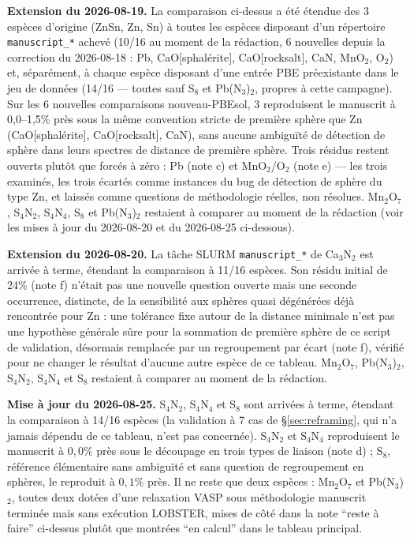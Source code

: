 \textbf{Extension du 2026-08-19.} La comparaison ci-dessus a été
étendue des 3 espèces d'origine (ZnSn, Zn, Sn) à toutes les espèces
disposant d'un répertoire \texttt{manuscript\_*} achevé (10/16 au
moment de la rédaction, 6 nouvelles depuis la correction du
2026-08-18 : Pb, CaO[sphalérite], CaO[rocksalt], CaN, MnO$_2$, O$_2$)
et, séparément, à chaque espèce disposant d'une entrée PBE préexistante
dans le jeu de données (14/16 --- toutes sauf S$_8$ et Pb(N$_3$)$_2$,
propres à cette campagne). Sur les 6 nouvelles comparaisons
nouveau-PBEsol, 3 reproduisent le manuscrit à 0,0--1,5\% près sous la
même convention stricte de première sphère que Zn (CaO[sphalérite],
CaO[rocksalt], CaN), sans aucune ambiguïté de détection de sphère dans
leurs spectres de distance de première sphère. Trois résidus restent
ouverts plutôt que forcés à zéro : Pb (note c) et MnO$_2$/O$_2$
(note e) --- les trois examinés, les trois écartés comme instances du
bug de détection de sphère du type Zn, et laissés comme questions de
méthodologie réelles, non résolues. Mn$_2$O$_7$, S$_4$N$_2$,
S$_4$N$_4$, S$_8$ et Pb(N$_3$)$_2$ restaient à comparer au moment de la
rédaction (voir les mises à jour du 2026-08-20 et du 2026-08-25
ci-dessous).

\textbf{Extension du 2026-08-20.} La tâche SLURM \texttt{manuscript\_*}
de Ca$_3$N$_2$ est arrivée à terme, étendant la comparaison à 11/16
espèces. Son résidu initial de 24\% (note f) n'était pas une nouvelle
question ouverte mais une seconde occurrence, distincte, de la
sensibilité aux sphères quasi dégénérées déjà rencontrée pour Zn : une
tolérance fixe autour de la distance minimale n'est pas une hypothèse
générale sûre pour la sommation de première sphère de ce script de
validation, désormais remplacée par un regroupement par écart (note f),
vérifié pour ne changer le résultat d'aucune autre espèce de ce
tableau. Mn$_2$O$_7$, Pb(N$_3$)$_2$, S$_4$N$_2$, S$_4$N$_4$ et S$_8$
restaient à comparer au moment de la rédaction.

\textbf{Mise à jour du 2026-08-25.} S$_4$N$_2$, S$_4$N$_4$ et S$_8$
sont arrivées à terme, étendant la comparaison à 14/16 espèces (la
validation à 7 cas de \S\ref{sec:reframing}, qui n'a jamais dépendu de
ce tableau, n'est pas concernée). S$_4$N$_2$ et S$_4$N$_4$ reproduisent
le manuscrit à $0{,}0\%$ près sous le découpage en trois types de
liaison (note d) ; S$_8$, référence élémentaire sans ambiguïté et sans
question de regroupement en sphères, le reproduit à $0{,}1\%$ près. Il
ne reste que deux espèces : Mn$_2$O$_7$ et Pb(N$_3$)$_2$, toutes deux
dotées d'une relaxation VASP sous méthodologie manuscrit terminée mais
sans exécution LOBSTER, mises de côté dans la note ``reste à faire''
ci-dessus plutôt que montrées ``en calcul'' dans le tableau principal.

